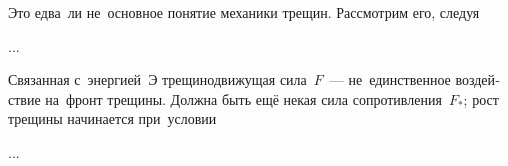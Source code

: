 \begin{otherlanguage}{russian}

Это едва~ли не~основное понятие механики трещин. Рассмотрим его, следуя

...



\end{otherlanguage}



\begin{otherlanguage}{russian}

Связанная с~энергией~$\textit{Э}$ трещинодвижущая сила~$F$~--- не~единственное воздействие на~фронт трещины. Должна быть ещё некая сила сопротивления~$F_{*}$; рост трещины начинается при~условии

...



\end{otherlanguage}







